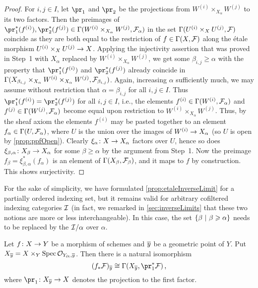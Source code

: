 \begin{proof}
	For $i,j\in I$, let $\pr_1$ and $\pr_2$ be the projections from $W^{(i)}\times_{X_\alpha}W^{(j)}$ to its two factors. Then the preimages of $\pr_1^*(f^{(i)}),\pr_2^*(f^{(j)})\in \Global(W^{(i)}\times_{X_\alpha}W^{(j)},\Ff_\alpha)$ in the set $\operatorname{\Gamma}(U^{(i)}\times_XU^{(j)},\mathcal{F})$ coincide as they are both equal to the restriction of $f\in\operatorname{\Gamma}(X,\mathcal{F})$ along the étale morphism $U^{(i)}\times_XU^{(j)}\morphism X$. Applying the injectivity assertion that was proved in Step~1 with $X_\alpha$ replaced by $W^{(i)}\times_{X_\alpha}W^{(j)}$, we get some $\beta_{i,j}\geq \alpha$ with the property that $\pr_1^*(f^{(i)})$ and $\pr_2^*(f^{(j)})$ already coincide in $\operatorname{\Gamma}(X_{\beta_{i,j}}\times_{X_\alpha}W^{(i)}\times_{X_\alpha}W^{(j)},\mathcal{F}_{\beta_{i,j}})$. Again, increasing $\alpha$  sufficiently much, we may assume without restriction that $\alpha=\beta_{i,j}$ for all $i,j\in I$. Thus $\pr_1^*(f^{(i)})=\pr_2^*(f^{(j)})$ for all $i,j\in I$, i.e., the elements $f^{(i)}\in \operatorname{\Gamma} (W^{(i)},\mathcal{F}_\alpha)$ and $f^{(j)}\in \operatorname{\Gamma} (W^{(j)},\mathcal{F}_\alpha)$ become equal upon restriction to $W^{(i)}\times_{X_\alpha}W^{(j)}$. Thus, by the sheaf axiom the elements $f^{(i)}$ may be pasted together to an element $f_\alpha\in\operatorname{\Gamma}(U,\mathcal{F}_\alpha)$, where $U$ is the union over the images of $W^{(i)}\morphism X_\alpha$ (so $U$ is open by \cref{prop:ppfOpen}). Clearly $\xi_\alpha\colon X\morphism X_\alpha$ factors over $U$, hence so does $\xi_{\beta,\alpha}\colon X_\beta\morphism X_\alpha$ for some $\beta\geq \alpha$ by the argument from Step~1. Now the preimage $f_\beta=\xi_{\beta,\alpha}^*(f_\alpha)$ is an element of $\operatorname{\Gamma}(X_\beta,\mathcal{F}_\beta)$, and it maps to $f$ by construction. This shows surjectivity.
\end{proof}
\begin{rem}
	For the sake of simplicity, we have formulated \cref{prop:etaleInverseLimit} for a partially ordered indexing set, but it remains valid for arbitrary cofiltered indexing categories $\mathcal{I}$ (in fact, we remarked in \cref{sec:inverseLimits} that these two notions are more or less interchangeable). In this case, the set $\left\{\beta\ \middle|\  \beta\geqslant \alpha\right\}$ needs to be replaced by the  $\mathcal{I}/\alpha$ over $\alpha$.
\end{rem}
\begin{cor}\label{cor:(f_*F)_y}
	Let $f\colon X\morphism Y$ be a morphism of schemes and $\ov{y}$ be a geometric point of $Y$. Put $X_{\ov{y}}=X\times_Y\Spec\Oo_{Y_\et,\ov{y}}$. Then there is a natural isomorphism
	\begin{equation*}
		(f_*\Ff)_{\ov{y}}\cong \Global(X_{\ov{y}},\pr_1^*\Ff)\,,
	\end{equation*}
	where $\pr_1\colon X_{\ov{y}}\morphism X$ denotes the projection to the first factor.
\end{cor}
